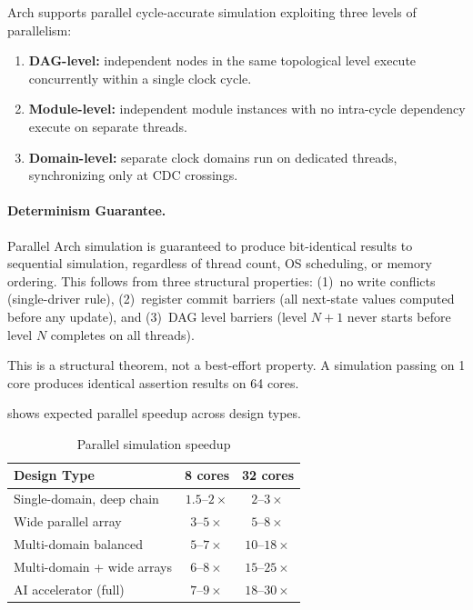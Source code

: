 \documentclass[manuscript]{acmart}
\begin{document}
Arch supports parallel cycle-accurate simulation exploiting three levels of parallelism:

\begin{enumerate}
\item \textbf{DAG-level:} independent nodes in the same topological level execute concurrently within a single clock cycle.
\item \textbf{Module-level:} independent module instances with no intra-cycle dependency execute on separate threads.
\item \textbf{Domain-level:} separate clock domains run on dedicated threads, synchronizing only at CDC crossings.
\end{enumerate}

\paragraph{Determinism Guarantee.}
Parallel Arch simulation is guaranteed to produce bit-identical results to sequential simulation, regardless of thread count, OS scheduling, or memory ordering. This follows from three structural properties:
(1)~no write conflicts (single-driver rule),
(2)~register commit barriers (all next-state values computed before any update), and
(3)~DAG level barriers (level $N{+}1$ never starts before level $N$ completes on all threads).

This is a structural theorem, not a best-effort property. A simulation passing on 1 core produces identical assertion results on 64 cores.

 shows expected parallel speedup across design types.

\begin{table}[H]
\centering
\caption{Parallel simulation speedup}
\label{tab:scaling}
\small
\begin{tabular}{@{}lcc@{}}
\toprule
\textbf{Design Type} & \textbf{8 cores} & \textbf{32 cores} \\
\midrule
Single-domain, deep chain & $1.5$--$2\times$ & $2$--$3\times$ \\
Wide parallel array & $3$--$5\times$ & $5$--$8\times$ \\
Multi-domain balanced & $5$--$7\times$ & $10$--$18\times$ \\
Multi-domain + wide arrays & $6$--$8\times$ & $15$--$25\times$ \\
AI accelerator (full) & $7$--$9\times$ & $18$--$30\times$ \\
\bottomrule
\end{tabular}
\end{table}
\end{document}
